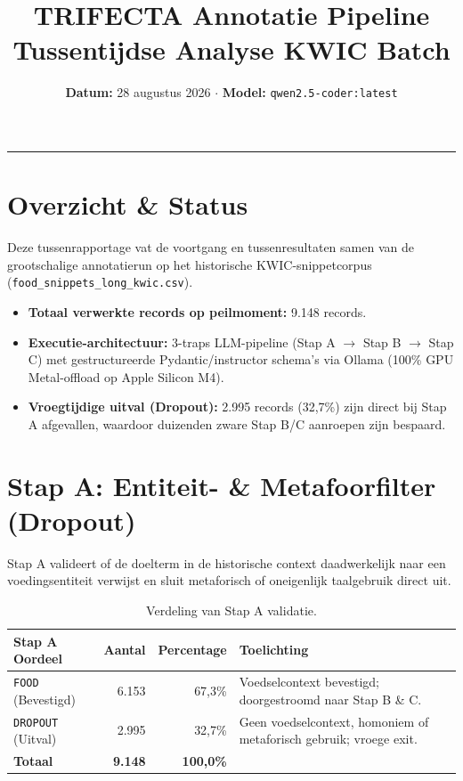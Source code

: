 \documentclass[a4paper,11pt]{article}
\title{\textbf{\LARGE TRIFECTA Annotatie Pipeline}\\[0.3em] \Large Tussentijdse Analyse KWIC Batch}
\author{\textbf{Datum:} 28 augustus 2026 \quad $\cdot$ \quad \textbf{Model:} \texttt{qwen2.5-coder:latest}}
\date{}
\begin{document}
\maketitle

\vspace{-1.5em}
\noindent\rule{\textwidth}{1.5pt}
\vspace{1em}

\section{Overzicht \& Status}

Deze tussenrapportage vat de voortgang en tussenresultaten samen van de grootschalige annotatierun op het historische KWIC-snippetcorpus (\texttt{food\_snippets\_long\_kwic.csv}). 

\begin{itemize}
    \item \textbf{Totaal verwerkte records op peilmoment:} 9.148 records.
    \item \textbf{Executie-architectuur:} 3-traps LLM-pipeline (Stap A $\rightarrow$ Stap B $\rightarrow$ Stap C) met gestructureerde Pydantic/instructor schema's via Ollama (100\% GPU Metal-offload op Apple Silicon M4).
    \item \textbf{Vroegtijdige uitval (Dropout):} 2.995 records (32,7\%) zijn direct bij Stap A afgevallen, waardoor duizenden zware Stap B/C aanroepen zijn bespaard.
\end{itemize}

\section{Stap A: Entiteit- \& Metafoorfilter (Dropout)}

Stap A valideert of de doelterm in de historische context daadwerkelijk naar een voedingsentiteit verwijst en sluit metaforisch of oneigenlijk taalgebruik direct uit.

\begin{table}[h!]
\centering
\begin{tabular}{lrrp{7.5cm}}
\toprule
\textbf{Stap A Oordeel} & \textbf{Aantal} & \textbf{Percentage} & \textbf{Toelichting} \\
\midrule
\texttt{FOOD} (Bevestigd) & 6.153 & 67,3\% & Voedselcontext bevestigd; doorgestroomd naar Stap B \& C. \\
\texttt{DROPOUT} (Uitval) & 2.995 & 32,7\% & Geen voedselcontext, homoniem of metaforisch gebruik; vroege exit. \\
\midrule
\textbf{Totaal} & \textbf{9.148} & \textbf{100,0\%} & \\
\bottomrule
\end{tabular}
\caption{Verdeling van Stap A validatie.}
\end{table}
\end{document}
